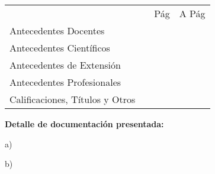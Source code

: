 \documentclass{article}
\begin{document}
\noindent \begin{tabular}{lccc}

\vspace{0.3cm}

 &\hspace{2cm} &\textrm{\hspace{0.5cm} P\'ag \hspace{0.5cm}} & \textrm{\hspace{0.5cm} A P\'ag \hspace{0.5cm}} \\

\vspace{0.1cm}

\textrm{Antecedentes Docentes}& & ~\pageref{begin-docentes} & ~\pageref{end-docentes} \\

\vspace{0.1cm}

\textrm{Antecedentes Científicos}& & ~\pageref{begin-cientificos} & ~\pageref{end-cientificos} \\

\vspace{0.1cm}

\textrm{Antecedentes de Extensión}& & ~\pageref{begin-extension} & ~\pageref{end-extension} \\

\vspace{0.1cm}

\textrm{Antecedentes Profesionales}& & ~\pageref{begin-profesionales} & ~\pageref{end-profesionales} \\

\vspace{0.1cm}

\textrm{Calificaciones, Títulos y Otros}& & ~\pageref{begin-otros} & ~\pageref{end-otros} \\

\end{tabular}

\bigskip
\bigskip
\bigskip

{\noindent \bf Detalle de documentación presentada:}

\bigskip

\noindent a) \hfill \hdashrule{16cm}{0.5pt}{0.75pt}

\medskip

\hdashrule{\linewidth}{0.5pt}{0.75pt}

\medskip

\noindent b) \hfill \hdashrule{16cm}{0.5pt}{0.75pt}
\end{document}
